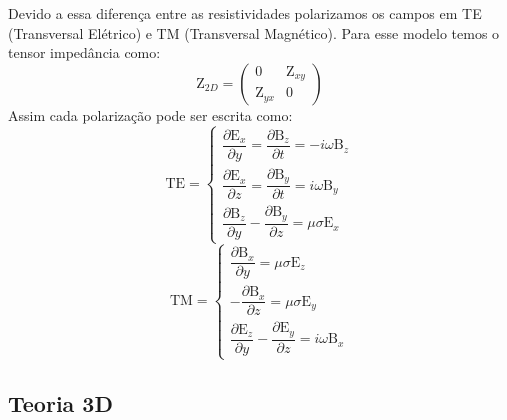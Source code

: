 	    Devido a essa diferença entre as resistividades polarizamos os campos em TE (Transversal Elétrico) e TM (Transversal Magnético).
	    Para esse modelo temos o tensor impedância como:
	    \begin{equation}
	     \textrm{Z}_{2D} = \left (\begin{array}{cc}
	                               0 & \textrm{Z}_{xy} \\
	                               \textrm{Z}_{yx} & 0
	                              \end{array} \right)
	    \end{equation}
	    Assim cada polarização pode ser escrita como:
	    \begin{equation}
	     \textrm{TE} = \left \{ \begin{array}{l}
	            \dfrac{\partial \textrm{E}_x}{\partial y} = \dfrac{\partial \textrm{B}_z}{\partial t} = -i\omega \textrm{B}_z \\
	           \dfrac{\partial \textrm{E}_x}{\partial z} = \dfrac{\partial \textrm{B}_y}{\partial t} = i\omega \textrm{B}_y \\
	           \dfrac{\partial \textrm{B}_z}{\partial y} - \dfrac{\partial \textrm{B}_y}{\partial z} = \mu \sigma \textrm{E}_x 
	           \end{array} \right.
	    \end{equation}
	    \begin{equation}
	     \textrm{TM} = \left \{ \begin{array}{l}
	            \dfrac{\partial \textrm{B}_x}{\partial y} = \mu \sigma \textrm{E}_z \\
	           -\dfrac{\partial \textrm{B}_x}{\partial z} = \mu \sigma \textrm{E}_y \\
	           \dfrac{\partial \textrm{E}_z}{\partial y} - \dfrac{\partial \textrm{E}_y}{\partial z} = i \omega \textrm{B}_x 
	           \end{array} \right.
	    \end{equation}
	    \subsection{Teoria 3D}
	    
